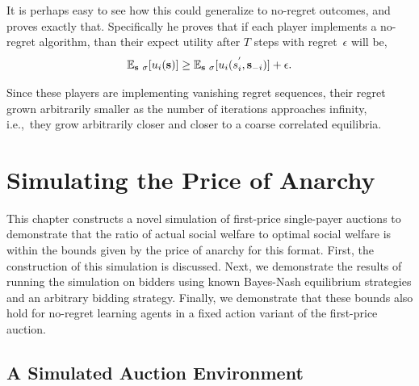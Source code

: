 \documentclass[12pt,twoside]{reedthesis}
\begin{document}
It is perhaps easy to see how this could generalize to no-regret outcomes, and \cite{Roughgarden2016} proves exactly that. Specifically he proves that if each player implements a no-regret algorithm, than their expect utility after $T$ steps with regret~$\epsilon$ will be,
$$ \mathbb{E}_{\textbf{s} ~ \sigma}[u_i(\textbf{s})] \geq \mathbb{E}_{\textbf{s} ~ \sigma}[u_i(s_i^{'}, \textbf{s}_{-i})] + \epsilon.$$

Since these players are implementing vanishing regret sequences, their regret grown arbitrarily smaller as the number of iterations approaches infinity, i.e.,~they grow arbitrarily closer and closer to a coarse correlated equilibria.




\chapter{Simulating the Price of Anarchy}

This chapter constructs a novel simulation of first-price single-payer auctions to demonstrate that the ratio of actual social welfare to optimal social welfare is within the bounds given by the price of anarchy for this format. First, the construction of this simulation is discussed. Next, we demonstrate the results of running the simulation on bidders using known Bayes-Nash equilibrium strategies and an arbitrary bidding strategy. Finally, we demonstrate that these bounds also hold for no-regret learning agents in a fixed action variant of the first-price auction.

\section{A Simulated Auction Environment}
\end{document}
